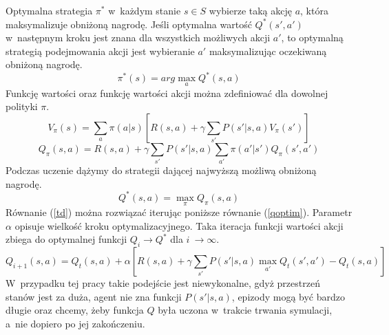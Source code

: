 \documentclass[12pt, oneside]{article}
\begin{document}
Optymalna strategia $\pi^*$ w~każdym stanie $s \in S$ wybierze taką akcję $a$, która maksymalizuje obniżoną nagrodę. Jeśli optymalna wartość $Q^*(s',a')$ w~następnym kroku jest znana dla wszystkich możliwych akcji $a'$, to optymalną strategią podejmowania akcji jest wybieranie $a'$ maksymalizując oczekiwaną obniżoną nagrodę. 
\begin{equation}
\pi^*(s)=arg\max_aQ^*(s,a)
\end{equation} 
Funkcję wartości oraz funkcję wartości akcji można zdefiniować dla dowolnej polityki $\pi$.
\begin{equation}
V_\pi(s)= \sum_a \pi(a|s)[R(s,a)+ \gamma \sum_{s'}P(s'|s,a)V_\pi(s')]
\end{equation}
\begin{equation}
Q_\pi(s,a) =R(s,a) + \gamma \sum_{s'}P(s'|s,a)\sum_{a'}\pi(a'|s')Q_\pi(s',a')
\end{equation}
Podczas uczenie dążymy do strategii dającej najwyższą możliwą obniżoną nagrodę.
\begin{equation}
Q^*(s,a)=\max_\pi Q_\pi (s,a)
\label{td}
\end{equation}
Równanie (\ref{td}) można rozwiązać iterując poniższe równanie (\ref{qoptim}). Parametr $\alpha$ opisuje wielkość kroku optymalizacyjnego. Taka iteracja funkcji wartości akcji zbiega do optymalnej funkcji $Q_i \rightarrow Q^* $ dla $ i~\rightarrow \infty$\cite{sutton}.
\begin{equation}
Q_{i+1}(s,a)=Q_t(s,a)+\alpha[R(s,a)+\gamma \sum_{s'}P(s'|s,a) \max_{a'} Q_t(s',a') - Q_t(s,a)]
\label{qoptim}
\end{equation}
W~przypadku tej pracy takie podejście jest niewykonalne, gdyż przestrzeń stanów jest za duża, agent nie zna funkcji $P(s'|s,a)$, epizody mogą być bardzo długie oraz chcemy, żeby funkcja $Q$ była uczona w~trakcie trwania symulacji, a~nie dopiero po jej zakończeniu.
\end{document}
